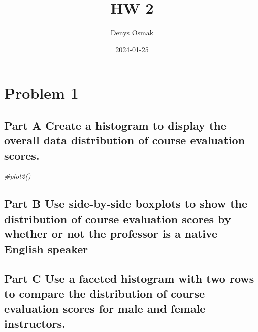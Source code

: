 \documentclass[
]{article}
\title{HW 2}
\author{Denys Osmak}
\date{2024-01-25}
\newenvironment{Shaded}{\begin{snugshade}}{\end{snugshade}}
\newcommand{\CommentTok}[1]{\textcolor[rgb]{0.56,0.35,0.01}{\textit{#1}}}
\begin{document}
\maketitle

\hypertarget{problem-1}{%
\section{Problem 1}\label{problem-1}}

\hypertarget{part-a-create-a-histogram-to-display-the-overall-data-distribution-of-course-evaluation-scores.}{%
\subsection{Part A Create a histogram to display the overall data
distribution of course evaluation
scores.}\label{part-a-create-a-histogram-to-display-the-overall-data-distribution-of-course-evaluation-scores.}}

\begin{Shaded}
\begin{Highlighting}[]
\CommentTok{\#plot2()}
\end{Highlighting}
\end{Shaded}

\hypertarget{part-b-use-side-by-side-boxplots-to-show-the-distribution-of-course-evaluation-scores-by-whether-or-not-the-professor-is-a-native-english-speaker}{%
\subsection{Part B Use side-by-side boxplots to show the distribution of
course evaluation scores by whether or not the professor is a native
English
speaker}\label{part-b-use-side-by-side-boxplots-to-show-the-distribution-of-course-evaluation-scores-by-whether-or-not-the-professor-is-a-native-english-speaker}}

\hypertarget{part-c-use-a-faceted-histogram-with-two-rows-to-compare-the-distribution-of-course-evaluation-scores-for-male-and-female-instructors.}{%
\subsection{Part C Use a faceted histogram with two rows to compare the
distribution of course evaluation scores for male and female
instructors.}\label{part-c-use-a-faceted-histogram-with-two-rows-to-compare-the-distribution-of-course-evaluation-scores-for-male-and-female-instructors.}}
\end{document}
